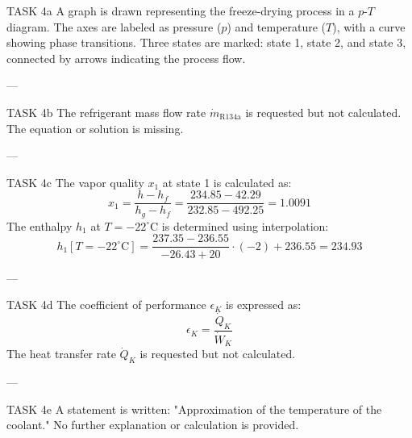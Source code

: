 TASK 4a  
A graph is drawn representing the freeze-drying process in a \( p \)-\( T \) diagram. The axes are labeled as pressure (\( p \)) and temperature (\( T \)), with a curve showing phase transitions. Three states are marked: state 1, state 2, and state 3, connected by arrows indicating the process flow.

---

TASK 4b  
The refrigerant mass flow rate \( \dot{m}_{\text{R134a}} \) is requested but not calculated. The equation or solution is missing.

---

TASK 4c  
The vapor quality \( x_1 \) at state 1 is calculated as:  
\[
x_1 = \frac{h - h_f}{h_g - h_f} = \frac{234.85 - 42.29}{232.85 - 492.25} = 1.0091
\]  
The enthalpy \( h_1 \) at \( T = -22^\circ\text{C} \) is determined using interpolation:  
\[
h_1[T = -22^\circ\text{C}] = \frac{237.35 - 236.55}{-26.43 + 20} \cdot (-2) + 236.55 = 234.93
\]

---

TASK 4d  
The coefficient of performance \( \epsilon_K \) is expressed as:  
\[
\epsilon_K = \frac{\dot{Q}_K}{\dot{W}_K}
\]  
The heat transfer rate \( \dot{Q}_K \) is requested but not calculated.

---

TASK 4e  
A statement is written:  
"Approximation of the temperature of the coolant."  
No further explanation or calculation is provided.